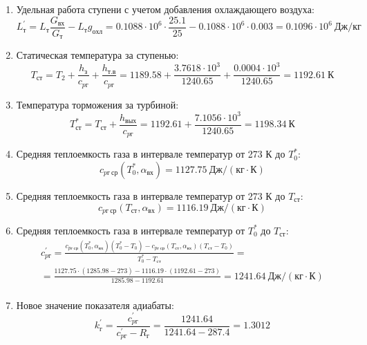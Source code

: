 \documentclass[a4paper,10pt]{article}
\begin{document}
\begin{enumerate}
        

        \item Удельная работа ступени с учетом добавления охлаждающего воздуха:
        \[
            L_т^\prime = L_т \frac{ G_{вх} }{ G_т }  - L_т g_{охл} =
                0.1088 \cdot 10^6 \cdot
                \frac{ 25.1 }{ 25 }  -
                0.1088 \cdot 10^6 \cdot 0.003 =
            0.1096 \cdot 10^6 \ Дж/кг
        \]

        \item Статическая температура за ступенью:
        \[
            T_{ст} = T_2 + \frac{ h_з }{ c_{pг} } + \frac{ h_{т.в} }{ c_{pг} } =
                1189.58 +
                \frac{3.7618 \cdot 10^3 }{ 1240.65 } +
                \frac{ 0.0004 \cdot 10^3 }{ 1240.65 } =
            1192.61 \ К
        \]

        \item Температура торможения за турбиной:
        \[
            T_{ст}^* = T_{ст} + \frac{ h_{вых} }{ c_{pг} } =
                1192.61 +
                \frac{ 7.1056 \cdot 10^3 }{ 1240.65 } =
            1198.34 \ К
        \]

        \item Средняя теплоемкость газа в интервале температур от 273 К до $T_0^*$:
        \[
            c_{pг\ ср} (T_0^*, \alpha_{вх}) =
            1127.75 \ Дж/(кг \cdot К)
        \]

        \item Средняя теплоемкость газа в интервале температур от 273 К до $T_{ст}$:
        \[
            c_{pг\ ср} (T_{ст}, \alpha_{вх}) =
            1116.19 \ Дж/(кг \cdot К)
        \]

        \item Средняя теплоемкость газа в интервале температур от $T_0^*$ до $T_{ст}$:
        \begin{gather*}
            c_{pг}^\prime = \frac{
		        c_{pг\ ср} (T_0^*, \alpha_{вх}) (T_0^* - T_0) - c_{pг\ ср} (T_{ст}, \alpha_{вх})(T_{ст} - T_0)
		    }{
		        T_0^* - T_{ст}} =\\
            =\frac{
		        1127.75 \cdot
                (1285.98 - 273) -
		        1116.19 \cdot
                (1192.61 - 273)
		    }{
		        1285.98 - 1192.61} =
		    1241.64 \ Дж / (кг \cdot К)\\
        \end{gather*}

        \item Новое значение показателя адиабаты:
        \[
            k_г^\prime = \frac{c_{pг}^\prime}{c_{pг}^\prime - R_г} =
                \frac{
                    1241.64
                }{
                    1241.64 - 287.4
                }
            = 1.3012
        \]


\end{enumerate}
\end{document}
